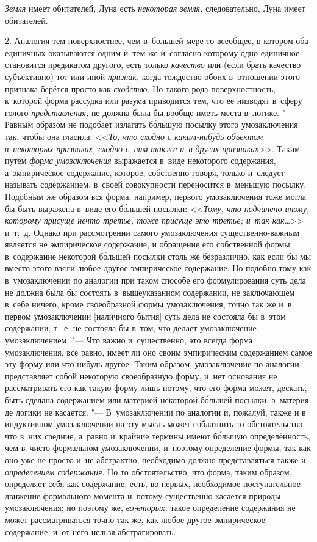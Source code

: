 {\em Земля} имеет обитателей,
Луна есть {\em некоторая земля,}
следовательно, Луна имеет обитателей.

2. Аналогия тем поверхностнее, чем в~большей мере то всеобщее,
в котором оба единичных оказываются одним и~тем же и~согласно которому одно
единичное становится предикатом другого, есть только
{\em качество} или (если
брать качество субъективно) тот или иной
{\em признак,} когда
тождество обоих в~отношении этого признака берётся просто как
{\em сходство}. Но такого
рода поверхностность, к~которой форма рассудка или разума приводится тем,
что её низводят в~сферу голого
{\em представления,} не
должна была бы вообще иметь места в~логике. "--- Равным
образом не подобает излагать б\'{о}льшую посылку этого умозаключения так, чтобы
она гласила: <<{\em То, что сходно с
каким-нибудь объектом в~некоторых признаках, сходно с~ним также и~в других
признаках}>>. Таким путём
{\em форма умозаключения}
выражается в~виде некоторого содержания, а~эмпирическое
содержание, которое, собственно говоря, только и~следует называть
содержанием, в~своей совокупности переносится в~меньшую посылку. Подобным
же образом вся форма, например, первого умозаключения тоже могла бы быть
выражена в~виде его б\'{о}льшей посылки:
<<{\em Тому, что подчинено иному, которому присуще нечто третье,
тоже присуще это третье; и~так как…}>> и~т.~д. Однако при рассмотрении самого
умозаключения существенно-важным является не эмпирическое содержание, и
обращение его собственной формы в~содержание некоторой б\'{о}льшей посылки
столь же безразлично, как если бы мы вместо этого взяли
любое другое эмпирическое содержание. Но подобно тому как в~умозаключении
по аналогии при таком способе его формулирования суть дела не должна была
бы состоять в~вышеуказанном содержании, не заключающем в~себе ничего, кроме
своеобразной формы умозаключения, точно так же и~в первом умозаключении
[наличного бытия] суть дела не состояла бы в~этом содержании, т.~е. не
состояла бы в~том, что делает умозаключение умозаключением. "---
Что важно и~существенно, это всегда форма умозаключения, всё
равно, имеет ли оно своим эмпирическим содержанием самое эту форму или
что-нибудь другое. Таким образом, умозаключение по аналогии представляет
собой некоторую своеобразную форму, и~нет основания не рассматривать его
как такую форму лишь потому, что его форма может, дескать, быть сделана
содержанием или материей некоторой б\'{о}льшей посылки, а~материя-де логики не
касается. "--- В~умозаключении по аналогии и, пожалуй, также и
в индуктивном умозаключении на эту мысль может соблазнить то
обстоятельство, что в~них средние, а~равно и~крайние термины имеют б\'{о}льшую
определённость, чем в~чисто формальном умозаключении, и~поэтому определение
формы, так как оно уже не просто и~не абстрактно, необходимо должно
представляться также и {\em определением
содержания}. Но то обстоятельство, что форма, таким образом,
определяет себя как содержание, есть, во-первых, необходимое поступательное
движение формального момента и~потому существенно касается природы
умозаключения; но поэтому же,
{\em во-вторых,} такое
определение содержания не может рассматриваться точно так же, как любое
другое эмпирическое содержание, и~от него нельзя абстрагировать.

